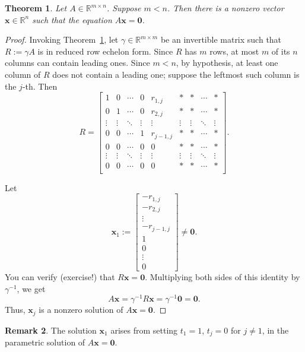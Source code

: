 \documentclass[12pt]{amsart}
\newcommand{\RR}{\mathbb{R}}
\newtheorem{theorem}{Theorem}[section]
\theoremstyle{definition}
\newtheorem{remark}[theorem]{Remark}
\newcommand{\bx}{\mathbf{x}}
\newcommand{\bzero}{\mathbf{0}}
\begin{document}
\begin{theorem}\label{theorem:row_equiv_to_rref}
	Let $A\in\RR^{m\times n}$.
	Suppose $m<n$.
	Then there is a \emph{nonzero} vector $\bx\in\RR^n$ such that the equation $A\bx=\bzero$.
\end{theorem}

\begin{proof}
	Invoking Theorem~\ref{theorem:row_equiv_to_rref}, let $\gamma\in\RR^{m\times m}$ be an invertible matrix such that
	$R := \gamma A$ is in reduced row echelon form.
	Since $R$ has $m$ rows, at most $m$ of its $n$ columns can contain leading ones.
	Since $m < n$, by hypothesis, at least one column of $R$ does not contain a leading one;
	suppose the leftmost such column is the $j$-th.
	Then
	\[
		R = \begin{bmatrix}
			1 & 0 & \cdots & 0 & r_{1,j} & * & * & \cdots & *\\
			0 & 1 & \cdots & 0 & r_{2,j} & * & * & \cdots & *\\
			\vdots & \vdots & \ddots & \vdots & \vdots & \vdots & \vdots & \ddots & \vdots\\
			0 & 0 & \cdots & 1 & r_{j-1, j} & * & * & \cdots & *\\
			0 & 0 & \cdots & 0 & 0 & * & * & \cdots & *\\
                        \vdots & \vdots & \ddots & \vdots & \vdots & \vdots & \vdots & \ddots & \vdots\\
			0 & 0 & \cdots & 0 & 0 & * & * & \cdots & *\\
		\end{bmatrix}.
	\]

	Let
	\[
		\bx_1 := \begin{bmatrix}-r_{1,j}\\-r_{2,j}\\\vdots\\-r_{j-1,j}\\1 \\ 0 \\  \vdots \\ 0\end{bmatrix}\neq \bzero.
	\]
	You can verify (exercise!) that $R\bx=\bzero$.
	Multiplying both sides of this identity by $\gamma^{-1}$, we get
	\[
		A\bx = \gamma^{-1}R \bx = \gamma^{-1}\bzero = \bzero.
	\]
	Thus, $\bx_j$ is a nonzero solution of $A\bx=\bzero$.
\end{proof}

\begin{remark}
	The solution $\bx_1$ arises from setting $t_1=1$, $t_j= 0$ for $j\neq 1$, in the parametric solution of $A\bx=\bzero$.
\end{remark}
\end{document}
